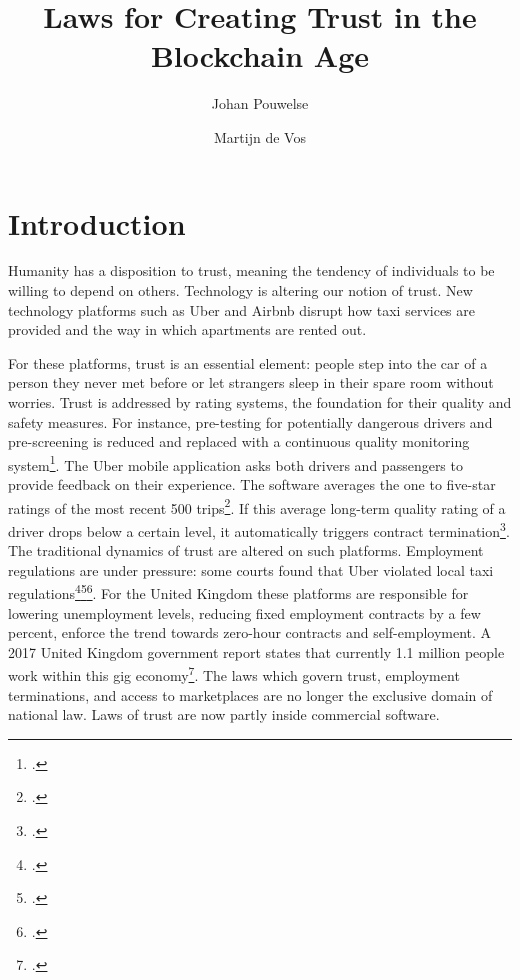 \documentclass[USenglish]{article}
\begin{document}

  \author*[1]{Johan Pouwelse}
  \author[2]{Martijn de Vos}
  \title{Laws for Creating Trust in the Blockchain Age}

\maketitle

\section{Introduction}
Humanity has a disposition to trust, meaning the tendency of individuals to be willing to depend on others.
Technology is altering our notion of trust.
New technology platforms such as Uber and Airbnb disrupt how taxi services are provided and the way in which apartments are rented out.

For these platforms, trust is an essential element: people step into the car of a person they never met before or let strangers sleep in their spare room without worries.
Trust is addressed by rating systems, the foundation for their quality and safety measures.
For instance, pre-testing for potentially dangerous drivers and pre-screening is reduced and replaced with a continuous quality monitoring system\footcite{uberfivestar}.
The Uber mobile application asks both drivers and passengers to provide feedback on their experience.
The software averages the one to five-star ratings of the most recent 500 trips\footcite{uberratinghelp}.
If this average long-term quality rating of a driver drops below a certain level, it automatically triggers contract termination\footcite{forbesuserfiring}. 
The traditional dynamics of trust are altered on such platforms.
Employment regulations are under pressure: some courts found that Uber violated local taxi regulations\footcite{ftuberregulation}\footcite{reutersuberdanish}\footcite{reutersubersouthkorea}.
For the United Kingdom these platforms are responsible for lowering unemployment levels, reducing fixed employment contracts by a few percent, enforce the trend towards zero-hour contracts and self-employment.
A 2017 United Kingdom government report states that currently 1.1 million people work within this gig economy\footcite{goodgigs}.
The laws which govern trust, employment terminations, and access to marketplaces are no longer the exclusive domain of national law.
Laws of trust are now partly inside commercial software.
\end{document}
